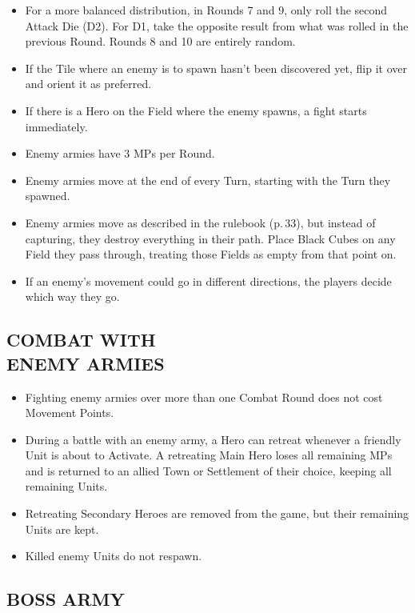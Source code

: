 \begin{multicols}{2}
\begin{itemize}
  \item For a more balanced distribution, in Rounds 7 and 9, only roll the second Attack Die (D2). For D1, take the opposite result from what was rolled in the previous Round.
  Rounds 8 and 10 are entirely random.
  \item If the Tile where an enemy is to spawn hasn't been discovered yet, flip it over and orient it as preferred.
  \item If there is a Hero on the Field where the enemy spawns, a fight starts immediately.

  \item Enemy armies have 3 MPs per Round.
  \item Enemy armies move at the end of every Turn, starting with the Turn they spawned.
  \item Enemy armies move as described in the rulebook (p.\,33), but instead of capturing, they destroy everything in their path.
    Place Black Cubes on any Field they pass through, treating those Fields as empty from that point on.
  \item If an enemy's movement could go in different directions, the players decide which way they go.
\end{itemize}

\subsection*{\MakeUppercase{Combat with\\Enemy Armies}}

\begin{itemize}
  \item Fighting enemy armies over more than one Combat Round does not cost Movement Points.
  \item During a battle with an enemy army, a Hero can retreat whenever a friendly Unit is about to Activate.
    A retreating Main Hero loses all remaining MPs and is returned to an allied Town or Settlement of their choice, keeping all remaining Units.
  \item Retreating Secondary Heroes are removed from the game, but their remaining Units are kept.
  \item Killed enemy Units do not respawn.
\end{itemize}

\subsection*{\MakeUppercase{Boss Army}}


\end{multicols}
